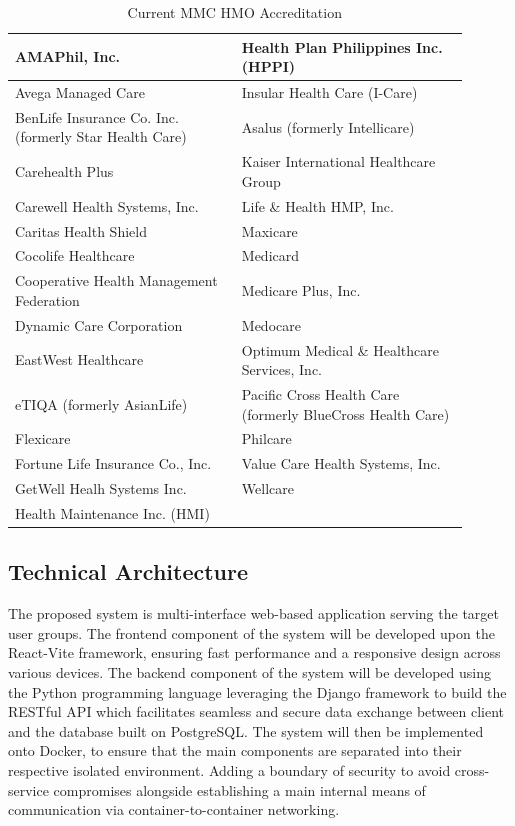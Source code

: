 \documentclass[11pt,a4paper,titlepage]{article}
\begin{document}
	\begin{table}[htbp]
		\centering
		\begin{tabular}{|p{0.45\linewidth}|p{0.45\linewidth}|}
			\hline
			AMAPhil, Inc. & Health Plan Philippines Inc. (HPPI) \\ \hline
			Avega Managed Care & Insular Health Care (I-Care) \\ \hline
			BenLife Insurance Co. Inc. (formerly Star Health Care) & Asalus (formerly Intellicare) \\ \hline
			Carehealth Plus & Kaiser International Healthcare Group \\ \hline
			Carewell Health Systems, Inc. & Life \& Health HMP, Inc. \\ \hline
			Caritas Health Shield & Maxicare \\ \hline
			Cocolife Healthcare & Medicard \\ \hline
			Cooperative Health Management Federation & Medicare Plus, Inc. \\ \hline
			Dynamic Care Corporation & Medocare \\ \hline
			EastWest Healthcare & Optimum Medical \& Healthcare Services, Inc. \\ \hline
			eTIQA (formerly AsianLife) & Pacific Cross Health Care (formerly BlueCross Health Care) \\ \hline
			Flexicare & Philcare \\ \hline
			Fortune Life Insurance Co., Inc. & Value Care Health Systems, Inc. \\ \hline
			GetWell Healh Systems Inc. & Wellcare \\ \hline
			Health Maintenance Inc. (HMI) & \\ \hline
		\end{tabular}
		\caption{Current MMC HMO Accreditation \cite{Rodriguez_A,makatimedicalcenter_doctors}}
		\label{tab:hmo-accred}
	\end{table}
	\clearpage
	
	\subsection{Technical Architecture}
	The proposed system is multi-interface web-based application serving the target user groups. The frontend component of the system will be developed upon the React-Vite framework, ensuring fast performance and a responsive design across various devices. The backend component of the system will be developed using the Python programming language leveraging the Django framework to build the RESTful API which facilitates seamless and secure data exchange between client and the database built on PostgreSQL. The system will then be implemented onto Docker, to ensure that the main components are separated into their respective isolated environment. Adding a boundary of security to avoid cross-service compromises alongside establishing a main internal means of communication via container-to-container networking. 
\end{document}
